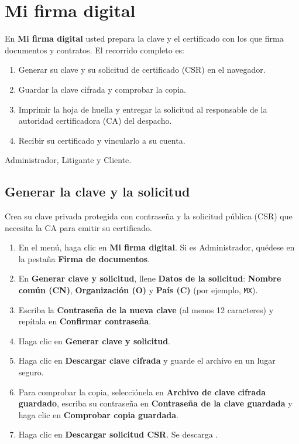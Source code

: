 \chapter{Mi firma digital}\label{cap:mi-firma-digital}

En \textbf{Mi firma digital} usted prepara la clave y el certificado con los
que firma documentos y contratos. El recorrido completo es:

\begin{enumerate}
  \item Generar su clave y su solicitud de certificado (CSR) en el navegador.
  \item Guardar la clave cifrada y comprobar la copia.
  \item Imprimir la hoja de huella y entregar la solicitud al responsable de
        la autoridad certificadora (CA) del despacho.
  \item Recibir su certificado y vincularlo a su cuenta.
\end{enumerate}

\disponible Administrador, Litigante y Cliente.


\section{Generar la clave y la solicitud}\label{sec:generar-clave}

\paraque Crea su clave privada protegida con contraseña y la solicitud
pública (CSR) que necesita la CA para emitir su certificado.

\pasos
\begin{enumerate}
  \item En el menú, haga clic en \textbf{Mi firma digital}. Si es
        Administrador, quédese en la pestaña \textbf{Firma de documentos}.
  \item En \textbf{Generar clave y solicitud}, llene
        \textbf{Datos de la solicitud}: \textbf{Nombre común (CN)},
        \textbf{Organización (O)} y \textbf{País (C)} (por ejemplo,
        \texttt{MX}).
  \item Escriba la \textbf{Contraseña de la nueva clave} (al menos 12
        caracteres) y repítala en \textbf{Confirmar contraseña}.
  \item Haga clic en \textbf{Generar clave y solicitud}.
  \item Haga clic en \textbf{Descargar clave cifrada} y guarde el archivo
         en un lugar seguro.
  \item Para comprobar la copia, selecciónela en
        \textbf{Archivo de clave cifrada guardado}, escriba su contraseña en
        \textbf{Contraseña de la clave guardada} y haga clic en
        \textbf{Comprobar copia guardada}.
  \item Haga clic en \textbf{Descargar solicitud CSR}. Se descarga
        .
\end{enumerate}

